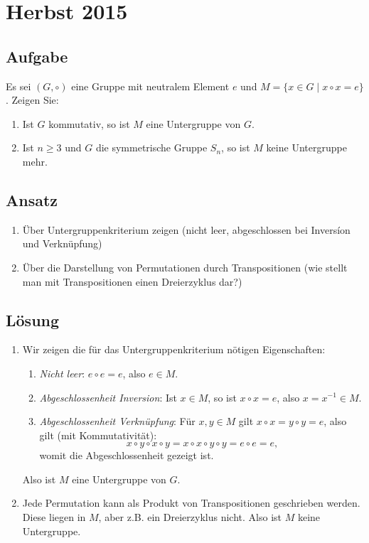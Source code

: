 \section{Herbst 2015}

\subsection{Aufgabe}
Es sei \( (G, \circ) \) eine Gruppe mit neutralem Element \( e \) und \( M = \{ x \in G \mid x \circ x = e \} \). Zeigen Sie:
\begin{enumerate}
	\item Ist \( G \) kommutativ, so ist \( M \) eine Untergruppe von \( G \).
	\item Ist \( n \geq 3 \) und \( G \) die symmetrische Gruppe \( S_n \), so ist \( M \) keine Untergruppe mehr.
\end{enumerate}

\subsection{Ansatz}
\begin{enumerate}
	\item Über Untergruppenkriterium zeigen (nicht leer, abgeschlossen bei Inversíon und Verknüpfung)
	\item Über die Darstellung von Permutationen durch Transpositionen (wie stellt man mit Transpositionen einen Dreierzyklus dar?) 
\end{enumerate}

\subsection{Lösung}
\begin{enumerate}
	\item Wir zeigen die für das Untergruppenkriterium nötigen Eigenschaften:
	\begin{enumerate}
	 	\item \emph{Nicht leer}: \( e \circ e = e \), also \( e \in M \).
	 	\item \emph{Abgeschlossenheit Inversion}: Ist \( x \in M \), so ist \( x \circ x = e \), also \( x = x^{-1} \in M \).
	 	\item \emph{Abgeschlossenheit Verknüpfung}: Für \( x,y \in M \) gilt \( x \circ x = y \circ y = e \), also gilt (mit Kommutativität):
	 	\begin{equation*}
	 		x \circ y \circ x \circ y = x \circ x \circ y \circ y = e \circ e = e\text{,}
	 	\end{equation*}
	 	womit die Abgeschlossenheit gezeigt ist.
	 \end{enumerate} 
	 Also ist \( M \) eine Untergruppe von \( G \).

	 \item Jede Permutation kann als Produkt von Transpositionen geschrieben werden. Diese liegen in \( M \), aber z.B. ein Dreierzyklus nicht. Also ist \( M \) keine Untergruppe.
\end{enumerate}

\newpage